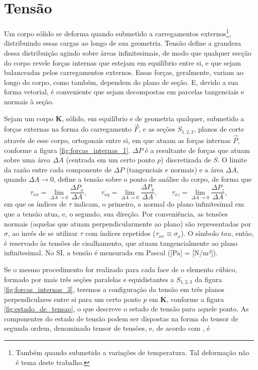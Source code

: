 \section{Tensão}
Um corpo sólido se deforma quando submetido a carregamentos externos\footnote{Também quando submetido a variações de temperatura. Tal deformação não é tema deste trabalho.}, distribuindo essas cargas ao longo de sua geometria. Tensão define a grandeza dessa distribuição agindo sobre áreas infinitesimais, de modo que qualquer secção do corpo revele forças internas que estejam em equilíbrio entre si, e que sejam balanceadas pelos carregamentos externos. Essas forças, geralmente, variam ao longo do corpo, como também, dependem do plano de seção. E, devido a sua forma vetorial, é conveniente que sejam decompostas em parcelas tangenciais e normais à seção. \cite{popov}



Sejam um corpo $\bm{K}$, sólido, em equilíbrio e de geometria qualquer, submetido a forças externas na forma do carregamento $\vec{F}$, e as seções $S_{1,2,3}$, planos de corte através de esse corpo, ortogonais entre si, em que atuam as forças internas $\vec{P}$, conforme a figura \ref{fig:forcas_internas_1}. $\Delta P$ é a resultante de forças que atuam sobre uma área $\Delta A$ (centrada em um certo ponto $p$) discretizada de $S$. O limite da razão entre cada componente de $\Delta P$ (tangenciais e normais) e a área $\Delta A$, quando $\Delta A \to 0$, define a tensão sobre o ponto de análise do corpo, de forma que
\begin{equation}
    \tau_{xx} = \lim_{\Delta A \to 0} \frac{\Delta P_x}{\Delta A}, \qquad
    \tau_{xy} = \lim_{\Delta A \to 0} \frac{\Delta P_y}{\Delta A}, \qquad
    \tau_{xz} = \lim_{\Delta A \to 0} \frac{\Delta P_z}{\Delta A},
\end{equation}
em que os índices de $\tau$ indicam, o primeiro, a normal do plano infinitesimal em que a tensão atua, e, o segundo, sua direção. Por conveniência, as tensões normais (aquelas que atuam perpendicularmente ao plano) são representadas por $\sigma$, ao invés de se utilizar $\tau$ com índices repetidos ($\tau_{xx} \equiv \sigma_x$). O símbolo $tau$, então, é reservado às tensões de cisalhamento, que atuam tangencialmente ao plano infinitesimal. No SI, a tensão é mensurada em Pascal ([Pa] = [N/m²]).

Se o mesmo procedimento for realizado para cada face de o elemento cúbico, formado por mais três seções paralelas e equidistantes a $S_{1,2,3}$ da figura \ref{fig:forcas_internas_3}, teremos a configuração da tensão em três planos perpendiculares entre si para um certo ponto $p$ em $\bm{K}$,  conforme a figura \ref{fig:estado_de_tensao}, o que descreve o estado de tensão para aquele ponto. As componentes do estado de tensão podem ser dispostas na forma do tensor de segunda ordem, denominado tensor de tensões, e, de acordo com , é

